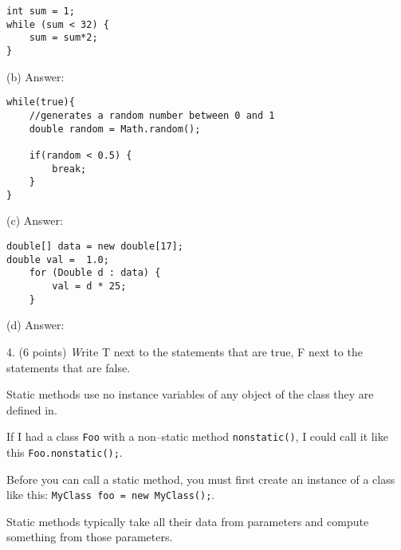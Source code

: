 \documentclass[12pt,twoside]{article}
\newcommand{\fillInBlank}[1][0.5in]{\underline{\hspace{#1}}}
\newcommand{\code}[1]{\texttt{#1}}
\begin{document}
\hfill
\begin{minipage}{0.58\linewidth}
\begin{lstlisting}
int sum = 1;
while (sum < 32) {
	sum = sum*2;
}
\end{lstlisting}
\end{minipage}
\hspace{0.25in}
\begin{minipage}[t]{0.25\linewidth}
(b) Answer: \fillInBlank
\end{minipage}
\vfill

\hfill
\begin{minipage}{0.58\linewidth}
\begin{lstlisting}
while(true){
	//generates a random number between 0 and 1
	double random = Math.random();

	if(random < 0.5) {
		break;
	}
}
\end{lstlisting}
\end{minipage}
\hspace{0.25in}
\begin{minipage}[t]{0.25\linewidth}
(c) Answer: \fillInBlank
\end{minipage}
\vfill

\hfill
\begin{minipage}{0.58\linewidth}
\begin{lstlisting}
double[] data = new double[17]; 
double val =  1.0;
	for (Double d : data) {
		val = d * 25;
	}
\end{lstlisting}
\end{minipage}
\hspace{0.25in}
\begin{minipage}[t]{0.25\linewidth}
(d) Answer: \fillInBlank
\end{minipage}
\vfill

\clearpage

4. (6 points) {\emph Write T next to the statements that are true, F next to the statements that are false.}

 \fillInBlank Static methods use no instance variables of any object of the class they are defined in.
 
  \fillInBlank If I had a class \code{Foo} with a non--static method \code{nonstatic()}, I could call it like this \code{Foo.nonstatic();}.
 
  \fillInBlank Before you can call a static method, you must first create an instance of a class like this: \code{MyClass foo = new MyClass();}.

  \fillInBlank Static methods typically take all their data from parameters and compute something from those parameters.
    
\end{document}
